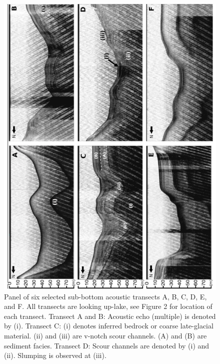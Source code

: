 \documentclass[Royal,times,doublespace,sageh]{sagej}
\begin{document}
\begin{figure}

{\centering \includegraphics[width=1\linewidth]{figs/acoustics_6_panel} 

}

\caption{Panel of six selected sub-bottom acoustic transects A, B, C, D, E, and F. All transects are looking up-lake, see Figure 2 for location of each transect. Transect A and B: Acoustic echo (multiple) is denoted by (i). Transect C: (i) denotes inferred bedrock or coarse late-glacial material. (ii) and (iii) are v-notch scour channels. (A) and (B) are sediment facies. Transect D: Scour channels are denoted by (i) and (ii). Slumping is observed at (iii).}\label{fig:acoustics}
\end{figure}
\end{document}
